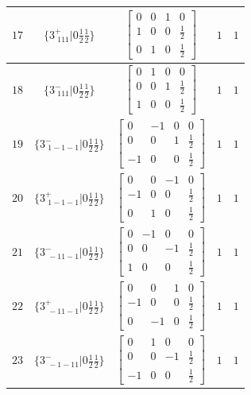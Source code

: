 \documentclass[fleqn,8pt]{jsarticle}
\begin{document}
\begin{longtable}{ccccc}
$ 17 $ & $ \{3^{+}_{\,\,111}|0 \frac{1}{2} \frac{1}{2}\} $ & $ \begin{bmatrix} 0 & 0 & 1 & 0 \\ 1 & 0 & 0 & \frac{1}{2} \\ 0 & 1 & 0 & \frac{1}{2} \end{bmatrix} $ & $ 1 $ & $ 1 $ \\ \hline
$ 18 $ & $ \{3^{-}_{\,\,111}|0 \frac{1}{2} \frac{1}{2}\} $ & $ \begin{bmatrix} 0 & 1 & 0 & 0 \\ 0 & 0 & 1 & \frac{1}{2} \\ 1 & 0 & 0 & \frac{1}{2} \end{bmatrix} $ & $ 1 $ & $ 1 $ \\ \hline
$ 19 $ & $ \{3^{-}_{\,\,1-1-1}|0 \frac{1}{2} \frac{1}{2}\} $ & $ \begin{bmatrix} 0 & -1 & 0 & 0 \\ 0 & 0 & 1 & \frac{1}{2} \\ -1 & 0 & 0 & \frac{1}{2} \end{bmatrix} $ & $ 1 $ & $ 1 $ \\ \hline
$ 20 $ & $ \{3^{+}_{\,\,1-1-1}|0 \frac{1}{2} \frac{1}{2}\} $ & $ \begin{bmatrix} 0 & 0 & -1 & 0 \\ -1 & 0 & 0 & \frac{1}{2} \\ 0 & 1 & 0 & \frac{1}{2} \end{bmatrix} $ & $ 1 $ & $ 1 $ \\ \hline
$ 21 $ & $ \{3^{-}_{\,\,-11-1}|0 \frac{1}{2} \frac{1}{2}\} $ & $ \begin{bmatrix} 0 & -1 & 0 & 0 \\ 0 & 0 & -1 & \frac{1}{2} \\ 1 & 0 & 0 & \frac{1}{2} \end{bmatrix} $ & $ 1 $ & $ 1 $ \\ \hline
$ 22 $ & $ \{3^{+}_{\,\,-11-1}|0 \frac{1}{2} \frac{1}{2}\} $ & $ \begin{bmatrix} 0 & 0 & 1 & 0 \\ -1 & 0 & 0 & \frac{1}{2} \\ 0 & -1 & 0 & \frac{1}{2} \end{bmatrix} $ & $ 1 $ & $ 1 $ \\ \hline
$ 23 $ & $ \{3^{-}_{\,\,-1-11}|0 \frac{1}{2} \frac{1}{2}\} $ & $ \begin{bmatrix} 0 & 1 & 0 & 0 \\ 0 & 0 & -1 & \frac{1}{2} \\ -1 & 0 & 0 & \frac{1}{2} \end{bmatrix} $ & $ 1 $ & $ 1 $ \\ \hline

\end{longtable}
\end{document}
